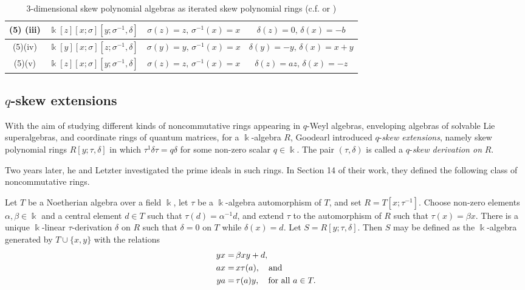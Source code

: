 \documentclass{amsart}
\theoremstyle{definition}
\theoremstyle{remark}
\numberwithin{equation}{section}
\begin{document}
\begin{landscape}
{{\begin{table}[h!]
\begin{tabular}{|c|c|c|c|}
(5) (iii) & $\Bbbk[z][x;\sigma][y;\sigma^{-1},\delta]$ & $\sigma(z) = z, \, \sigma^{-1}(x) = x$ & $\delta(z) = 0, \, \delta(x) = -b$ \\ \hline
(5)(iv) & $\Bbbk[y][x;\sigma][z;\sigma^{-1},\delta]$ & $\sigma(y) = y, \, \sigma^{-1}(x) = x$ & $\delta(y) = -y, \, \delta(x) = x+y$ \\ \hline
(5)(v) & $\Bbbk[z][x;\sigma][y;\sigma^{-1},\delta]$ & $\sigma(z) = z, \, \sigma^{-1}(x) = x$ & $\delta(z)=az, \, \delta(x) = -z$\\ \hline
\end{tabular}
\caption{3-dimensional skew polynomial algebras as iterated skew polynomial rings (c.f. \cite[Theorem C.4.3.1]{Rosenberg1995} or \cite[Proposition 2.8 and Remark 2.9]{RubianoReyes20263D})}
\label{3DAmbiskew}
\end{table}
}}
\end{landscape}


\subsection{\texorpdfstring{$q$}{Lg}-skew extensions}

With the aim of studying different kinds of noncommutative rings appearing in $q$-Weyl algebras, enveloping algebras of solvable Lie superalgebras, and coordinate rings of quantum matrices, for a $\Bbbk$-algebra $R$, Goodearl \cite{Goodearl1992} introduced $q$-{\em skew extensions}, namely skew polynomial rings $R[y; \tau, \delta]$ in which $\tau^{1}\delta \tau = q\delta$ for some non-zero scalar $q\in \Bbbk$. The pair $(\tau, \delta)$ is called a $q$-{\em skew derivation on} $R$.

Two years later, he and Letzter \cite{GoodearlLetzter1994} investigated the prime ideals in such rings. In Section 14 of their work, they defined the following class of noncommutative rings.

Let $T$ be a Noetherian algebra over a field $\Bbbk$, let $\tau$ be a $\Bbbk$-algebra automorphism of $T$, and set $R = T[x; \tau^{-1}]$. Choose non-zero elements $\alpha, \beta \in \Bbbk$ and a central element $d\in T$ such that $\tau(d) =  \alpha^{-1}d$, and extend $\tau$ to the automorphism of $R$ such that $\tau(x) = \beta x$. There is a unique $\Bbbk$-linear $\tau$-derivation $\delta$ on $R$ such that $\delta = 0$ on $T$ while $\delta(x) = d$. Let $S =  R[y; \tau, \delta]$. Then $S$ may be defined as the $\Bbbk$-algebra generated by $T\cup \{x, y\}$ with the relations
\begin{align}
yx = &\, \beta xy + d, \\
ax = &\, x\tau(a), \quad {\rm and} \\
ya = &\, \tau(a)y, \quad {\rm for\ all} \, \, a\in T.
\end{align}
\end{document}
